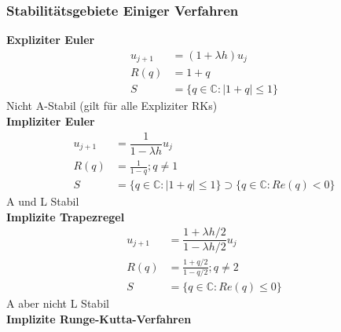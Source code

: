 \documentclass[
	ngerman,
	accentcolor=9c,%
	type=intern,
	marginpar=false
	]{tudapub}
\begin{document}
        \subsubsection{Stabilitätsgebiete Einiger Verfahren}
            \textbf{Expliziter Euler}
            \begin{align*}
                u_{j+1} &= (1+ \lambda h )u_j\\
                R(q) &= 1+q\\
                S&=\{q \in \mathbb{C} : |1+q| \leq 1\}
            \end{align*}
            Nicht A-Stabil (gilt für alle Expliziter RKs)\\[1ex]
            \textbf{Impliziter Euler}
            \begin{align*}
                u_{j+1} &= \dfrac{1}{1-\lambda h} u_j\\
                R(q) &= \frac{1}{1-q}; q \not = 1\\
                S&=\{q \in \mathbb{C} : |1+q| \leq 1\} \supset \{q \in \mathbb{C}: Re(q) <0 \}
            \end{align*}
            A und L Stabil\\[1ex]
            \textbf{Implizite Trapezregel}
            \begin{align*}
                u_{j+1} &= \dfrac{1 + \lambda h /2 }{1-\lambda h /2 } u_j\\
                R(q) &= \frac{1+q/2}{1-q/2}; q \not = 2\\
                S&= \{q \in \mathbb{C}: Re(q)  \leq 0 \}
            \end{align*}
            A aber nicht L Stabil\\[1ex]
            \textbf{Implizite Runge-Kutta-Verfahren}\\
\end{document}
